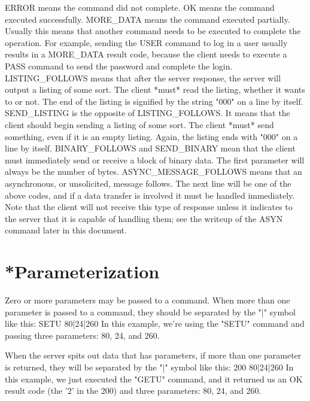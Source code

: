  ERROR means the command did not complete.
 OK means the command executed successfully.
 MORE_DATA means the command executed partially.  Usually this means that
another command needs to be executed to complete the operation.  For example,
sending the USER command to log in a user usually results in a MORE_DATA
result code, because the client needs to execute a PASS command to send the
password and complete the login.
 LISTING_FOLLOWS means that after the server response, the server will
output a listing of some sort.  The client *must* read the listing, whether
it wants to or not.  The end of the listing is signified by the string
"000" on a line by itself.
 SEND_LISTING is the opposite of LISTING_FOLLOWS.  It means that the client
should begin sending a listing of some sort.  The client *must* send something,
even if it is an empty listing.  Again, the listing ends with "000" on a line
by itself.
 BINARY_FOLLOWS and SEND_BINARY mean that the client must immediately send
or receive a block of binary data.  The first parameter will always be the
number of bytes.
 ASYNC_MESSAGE_FOLLOWS means that an asynchronous, or unsolicited, message
follows.  The next line will be one of the above codes, and if a data transfer
is involved it must be handled immediately.  Note that the client will not
receive this type of response unless it indicates to the server that it is
capable of handling them; see the writeup of the ASYN command later in this
document.

\section{*Parameterization}

 Zero or more parameters may be passed to a command.  When more than one
parameter is passed to a command, they should be separated by the "|"
symbol like this:
  SETU 80|24|260
 In this example, we're using the "SETU" command and passing three
parameters: 80, 24, and 260.

 When the server spits out data that has parameters, if more than one
parameter is returned, they will be separated by the "|" symbol like
this:
  200 80|24|260
 In this example, we just executed the "GETU" command, and it returned us
an OK result code (the '2' in the 200) and three parameters: 80, 24, and
260.

